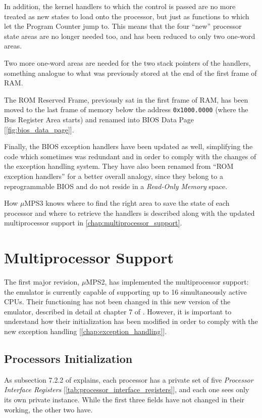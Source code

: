 \documentclass[12pt,a4paper,openright,twoside]{report}
\begin{document}
In addition, the kernel handlers to which the control is passed are no more treated as new states to load onto the processor, but just as functions to which let the Program Counter jump to.
This means that the four ``new'' processor state areas are no longer needed too, and has been reduced to only two one-word areas.

Two more one-word areas are needed for the two stack pointers of the handlers, something analogue to what was previously stored at the end of the first frame of RAM.

The ROM Reserved Frame, previously sat in the first frame of RAM, has been moved to the last frame of memory below the address \texttt{0x1000.0000} (where the Bus Register Area starts) and renamed into BIOS Data Page [\autoref{fig:bios_data_page}].

Finally, the BIOS exception handlers have been updated as well, simplifying the code which sometimes was redundant and in order to comply with the changes of the exception handling system.
They have also been renamed from ``ROM exception handlers'' for a better overall analogy, since they belong to a reprogrammable BIOS and do not reside in a \textit{Read-Only Memory} space.

How $\mu$MPS3 knows where to find the right area to save the state of each processor and where to retrieve the handlers is described along with the updated multiprocessor support in \autoref{chap:multiprocessor_support}.

\chapter{Multiprocessor Support}
\label{chap:multiprocessor_support}
\lhead[\fancyplain{}{\bfseries\thepage}]{\fancyplain{}{\bfseries\rightmark}}
The first major revision, $\mu$MPS2, has implemented the multiprocessor support: the emulator is currently capable of supporting up to 16 simultaneously active CPUs.
Their functioning has not been changed in this new version of the emulator, described in detail at chapter 7 of \cite{old_pops}.
However, it is important to understand how their initialization has been modified in order to comply with the new exception handling [\autoref{chap:exception_handling}].

\section{Processors Initialization}
As subsection 7.2.2 of \cite{old_pops} explains, each processor has a private set of five \textit{Processor Interface Registers} [\autoref{tab:processor_interface_registers}], and each one sees only its own private instance.
While the first three fields have not changed in their working, the other two have.
\end{document}
